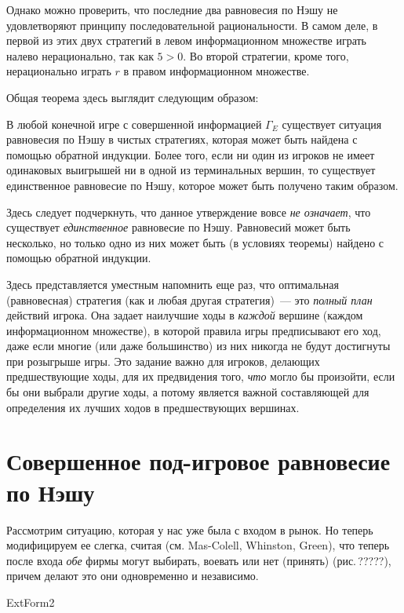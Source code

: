 \documentclass[12pt]{book}
\begin{document}
Однако можно проверить, что последние два равновесия по Нэшу не удовлетворяют
принципу последовательной рациональности. В самом деле, в первой
из этих двух стратегий в левом информационном множестве играть налево
нерационально, так как $5>0$. Во второй стратегии, кроме того,
нерационально играть $r$ в правом информационном множестве.

Общая теорема здесь выглядит следующим образом:
\begin{proposition}
В любой конечной игре с совершенной информацией $\Gamma_E$
существует ситуация равновесия по Hэшу в чистых стратегиях, которая
может быть найдена с помощью обратной индукции. Более того, если ни
один из игроков не имеет одинаковых выигрышей ни в одной из
терминальных вершин, то существует единственное равновесие по Нэшу, которое может
быть получено таким образом.
\end{proposition}

Здесь следует подчеркнуть, что данное утверждение вовсе \emph{не означает},
что существует \emph{единственное} равновесие по Нэшу. Равновесий может
быть несколько, но только одно из них может быть (в условиях
теоремы) найдено с помощью обратной индукции.

Здесь представляется уместным напомнить еще раз, что оптимальная
(равновесная) стратегия (как и любая другая стратегия)~--- это \emph{
полный план} действий игрока. Она задает наилучшие ходы в \emph{каждой}
вершине (каждом информационном множестве), в которой правила игры предписывают
его ход, даже если многие (или даже большинство) из них никогда не будут
достигнуты при розыгрыше игры. Это задание важно для игроков, делающих
предшествующие ходы, для их предвидения того, \emph{что} могло бы
произойти, если бы они выбрали другие ходы, а потому является важной
составляющей для определения их лучших ходов в предшествующих вершинах.



\section{Совершенное под-игровое равновесие по Нэшу}

Рассмотрим ситуацию, которая у нас уже была с входом в рынок. Но
теперь модифицируем ее слегка, считая (см. Mas-Colell, Whinston,
Green), что теперь после входа {\it обе} фирмы могут выбирать,
воевать или нет (принять) (рис.\,?????), причем делают это они
одновременно и независимо.

ExtForm2
\end{document}
